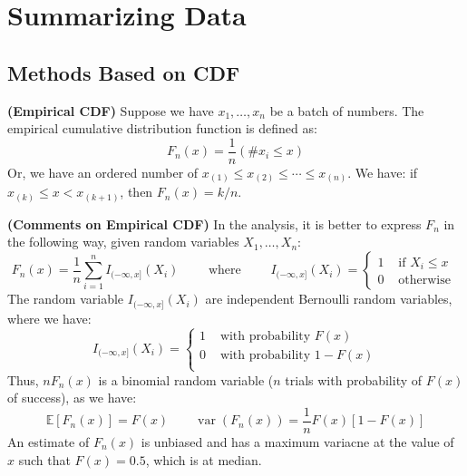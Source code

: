 \section{Summarizing Data}

\subsection{Methods Based on CDF}

\begin{definition}{\textbf{(Empirical CDF)}}
    Suppose we have $x_1,\dots,x_n$ be a batch of numbers. The empirical cumulative distribution function is defined as:
    \begin{equation*}
        F_n(x) = \frac{1}{n}(\# x_i \le x)
    \end{equation*}
    Or, we have an ordered number of $x_{(1)}\le x_{(2)} \le \cdots \le x_{(n)}$. We have: if $x_{(k)} \le x < x_{(k+1)}$, then $F_n(x) = k/n$. 
\end{definition}

\begin{remark}{\textbf{(Comments on Empirical CDF)}}
    In the analysis, it is better to express $F_n$ in the following way, given random variables $X_1,\dots,X_n$:
    \begin{equation*}
        F_n(x) = \frac{1}{n} \sum^n_{i=1} I_{(-\infty, x]}(X_i) \qquad \text{ where } \qquad I_{(-\infty, x]}(X_i) = \begin{cases}
            1 & \text{ if } X_i \le x \\
            0 & \text{ otherwise }
        \end{cases}
    \end{equation*}
    The random variable $I_{(-\infty, x]}(X_i)$ are independent Bernoulli random variables, where we have:
    \begin{equation*}
        I_{(-\infty, x]}(X_i) = \begin{cases}
            1 & \text{ with probability } F(x) \\
            0 & \text{ with probability } 1-F(x) \\
        \end{cases}
    \end{equation*}
    Thus, $nF_n(x)$ is a binomial random variable ($n$ trials with probability of $F(x)$ of success), as we have:
    \begin{equation*}
        \mathbb{E}[F_n(x)] = F(x) \qquad \operatorname{var}(F_n(x)) = \frac{1}{n}F(x)[1-F(x)]
    \end{equation*}
    An estimate of $F_n(x)$ is unbiased and has a maximum variacne at the value of $x$ such that $F(x) = 0.5$, which is at median. 
\end{remark}

